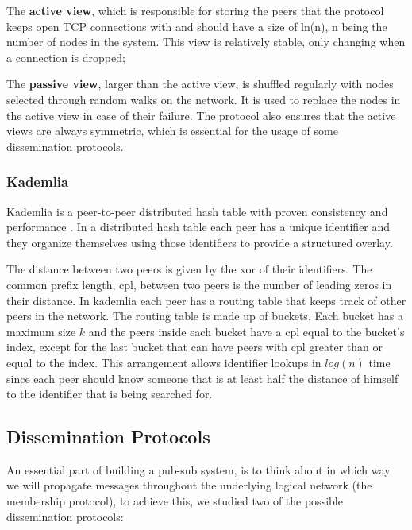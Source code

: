 \documentclass[sigconf]{acmart}
\begin{document}
The \textbf{active view}, which is responsible for storing the peers that the protocol keeps open TCP connections with and should have a size of ln(n), n being the number of nodes in the system. This view is relatively stable, only changing when a connection is dropped; 

The \textbf{passive view}, larger than the active view, is shuffled regularly with nodes selected through random walks on the network. It is used to replace the nodes in the active view in case of their failure. 
The protocol also ensures that the active views are always symmetric, which is essential for the usage of some dissemination protocols. 

\subsubsection{Kademlia}
Kademlia is a peer-to-peer distributed hash table with proven consistency and performance \cite{maymounkov2002kademlia}.
In a distributed hash table each peer has a unique identifier and they organize themselves using those identifiers to provide a structured overlay.

The distance between two peers is given by the xor of their identifiers.
The common prefix length, cpl, between two peers is the number of leading zeros in their distance.
In kademlia each peer has a routing table that keeps track of other peers in the network. The routing table is made up of buckets.
Each bucket has a maximum size $k$ and the peers inside each bucket have a cpl equal to the bucket's index, except for the last bucket that can have peers with cpl greater than or equal to the index.
This arrangement allows identifier lookups in $log(n)$ time since each peer should know someone that is at least half the distance of himself to the identifier that is being searched for.

\subsection{Dissemination Protocols}

An essential part of building a pub-sub system, is to think about in which way we will propagate messages throughout the underlying logical network (the membership protocol), to achieve this, we studied two of the possible dissemination protocols: 
\end{document}
